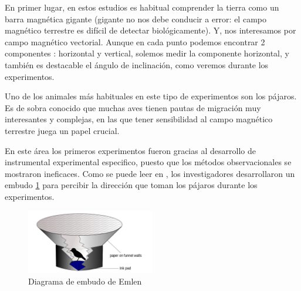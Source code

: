 \documentclass[1p]{elsarticle}
\begin{document}
En primer lugar, en estos estudios es habitual comprender la tierra como un barra magnética gigante (gigante no nos debe conducir a error: el campo magnético terrestre es difícil de detectar biológicamente). Y, nos interesamos por campo magnético vectorial. Aunque en cada punto podemos encontrar 2 componentes : horizontal y vertical, solemos medir la componente horizontal, y también es destacable el ángulo de inclinación, como veremos durante los experimentos. 

Uno de los animales más habituales en este tipo de experimentos son los pájaros. Es de sobra conocido que muchas aves tienen pautas de migración muy interesantes y complejas, en las que tener sensibilidad al campo magnético terrestre juega un papel crucial.

 En este área los primeros experimentos fueron gracias al desarrollo de instrumental experimental especifico, puesto que los métodos observacionales se mostraron ineficaces. Como se puede leer en \cite{embudo}, los investigadores desarrollaron un embudo \ref{embudo_1} para percibir la dirección que toman los pájaros durante los experimentos. 
  \begin{figure}
  	\centering
  	\includegraphics[width=0.5\textwidth]{emlen_funnel}
  	\caption{Diagrama de embudo de Emlen}
  	\label{embudo_1}
  \end{figure}
  
\end{document}
